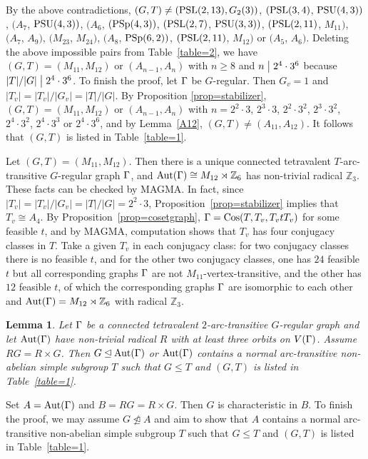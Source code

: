 \documentclass[12pt]{article}
\newtheorem{lem}{Lemma}[section]%
\def\di{\bigm|} \def\lg{\langle} \def\rg{\rangle}
\def\f{\noindent}
\def\PSL{\hbox{\rm PSL}}\def\PSU{\hbox{\rm PSU}}
\def\PSp{\hbox{\rm PSp}}\def\P\GammaL{\hbox{\rm P\Gamma L}} \def\ASIL{\hbox{\rm A\Sigma L}}
\def\Aut{\hbox{\rm Aut}}
\def\Cos{\hbox{\rm Cos}}
\newcommand{\qed}{\mbox{\raisebox{0.7ex}{\fbox{}}} \vspace{4truemm}}
\def\mz{{\mathbb Z}}
\begin{document}
By the above contradictions, $(G,T)\not=(\PSL(2,13),G_2(3))$, $(\PSL(3,4)$, $\PSU(4,3))$, $(A_7$, $\PSU(4,3))$, $(A_6$, $(\PSp(4,3))$, $(\PSL(2,7)$, $\PSU(3,3))$, $(\PSL(2,11)$, $M_{11})$, $(A_7$, $A_9)$, $(M_{23}$, $M_{24})$, $(A_8$, $\PSp(6,2))$, $(\PSL(2,11)$, $M_{12})$ or $(A_5$, $A_6)$. Deleting the above impossible pairs from Table~\ref{table=2}, we have $(G,T)=(M_{11},M_{12})$ or $(A_{n-1},A_n)$ with $n\geq 8$ and $n\di 2^4\cdot 3^6$ because $|T|/|G|\di 2^4\cdot 3^6$. To finish the proof, let $\Gamma$ be $G$-regular. Then $G_v=1$ and  $|T_v|=|T_v|/|G_v|=|T|/|G|$. By Proposition \ref{prop=stabilizer}, $(G,T)=(M_{11},M_{12})$ or $(A_{n-1},A_n)$ with $n=2^2\cdot 3$, $2^3\cdot 3$, $2^2\cdot3^2$, $2^3\cdot3^2$, $2^4\cdot3^2$, $2^4\cdot3^3$ or $2^4\cdot3^6$, and by Lemma~\ref{A12}, $(G,T)\not=(A_{11},A_{12})$. It follows that $(G,T)$ is listed in Table~\ref{table=1}.
\hfill\qed

\f {\bf Remark:} Let $(G,T)=(M_{11},M_{12})$. Then there is a unique connected tetravalent $T$-arc-transitive $G$-regular graph $\Gamma$, and $\Aut(\G)\cong M_{12}\rtimes\mz_6$ has  non-trivial radical $\mz_3$. These facts can be checked by MAGMA. In fact, since $|T_v|=|T_v|/|G_v|=|T|/|G|= 2^2\cdot3$, Proposition~\ref{prop=stabilizer} implies that $T_v\cong A_4$.  By Proposition~\ref{prop=cosetgraph}, $\G=\Cos(T,T_v,T_vtT_v)$ for some feasible $t$, and by MAGMA, computation shows that $T_v$  has four conjugacy classes in $T$. Take a given $T_v$ in each conjugacy class: for two conjugacy classes there is no feasible $t$, and for the other two conjugacy classes, one has $24$ feasible $t$ but all corresponding graphs $\Gamma$ are not $M_{11}$-vertex-transitive, and the other has $12$ feasible $t$, of which the corresponding graphs $\Gamma$ are isomorphic to each other and $\Aut(\G)=M_{12}\rtimes \mz_6$ with radical $\mz_3$.
\hfill\qed


\begin{lem}\label{lem=T normal}
Let $\Gamma$ be a connected tetravalent $2$-arc-transitive $G$-regular graph and let $\Aut(\G)$ have non-trivial radical $R$ with at least three orbits on $V(\Gamma)$. Assume $RG=R\times G$. Then $G\unlhd \Aut(\G)$ or $\Aut(\G)$ contains a normal arc-transitive non-abelian simple  subgroup $T$ such that $G\leq T$ and $(G,T)$ is listed in Table~\ref{table=1}.
\end{lem}

\f {\bf Proof:} Set $A=\Aut(\G)$ and $B=RG=R\times G$. Then $G$ is characteristic in $B$. To finish the proof, we may assume $G\ntrianglelefteq A$ and aim to show that $A$ contains a normal arc-transitive non-abelian simple  subgroup $T$ such that $G\leq T$ and $(G,T)$ is listed in Table~\ref{table=1}.
\end{document}
